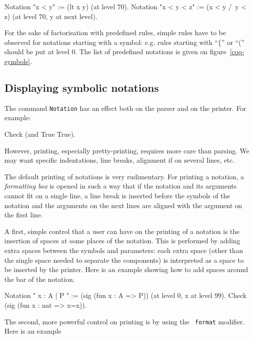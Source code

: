 \begin{coq_example*}
Notation "x < y"     := (lt x y) (at level 70).
Notation "x < y < z" := (x < y /\ y < z) (at level 70, y at next level).
\end{coq_example*}

For the sake of factorisation with {\Coq} predefined rules, simple
rules have to be observed for notations starting with a symbol:
e.g. rules starting with ``\{'' or ``('' should be put at level 0. The
list of {\Coq} predefined notations is given on
figure~\ref{coq-symbols}.

\subsection{Displaying symbolic notations}

The command \texttt{Notation} has an effect both on the {\Coq} parser and
on the {\Coq} printer. For example:

\begin{coq_example}
Check (and True True).
\end{coq_example}

However, printing, especially pretty-printing, requires
more care than parsing. We may want specific indentations,
line breaks, alignment if on several lines, etc. 

The default printing of notations is very rudimentary. For printing a
notation, a {\em formatting box} is opened in such a way that if the
notation and its arguments cannot fit on a single line, a line break
is inserted before the symbols of the notation and the arguments on
the next lines are aligned with the argument on the first line.

A first, simple control that a user can have on the printing of a
notation is the insertion of spaces at some places of the
notation. This is performed by adding extra spaces between the symbols
and parameters: each extra space (other than the single space needed
to separate the components) is interpreted as a space to be inserted
by the printer. Here is an example showing how to add spaces around
the bar of the notation.

\begin{coq_example}
Notation "{{ x : A  |  P }}" := (sig (fun x : A => P))
  (at level 0, x at level 99).
Check (sig (fun x : nat => x=x)).
\end{coq_example}

The second, more powerful control on printing is by using the {\tt
format} modifier. Here is an example

